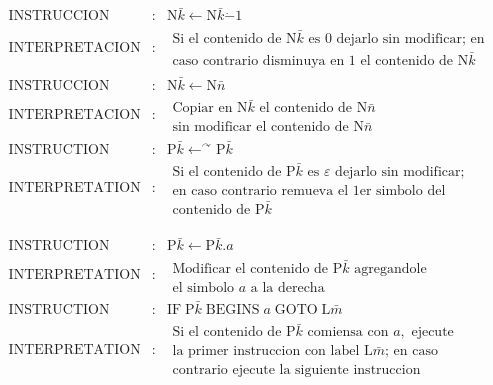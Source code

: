 \(\displaystyle \begin{array}{rcl} \text{INSTRUCCION} & :& \mathrm{N}\bar{k}\leftarrow \mathrm{N}\bar{k}\dot{-}1 \\ \text{INTERPRETACION} & :& \begin{array}{c} \text{Si el contenido de }\mathrm{N}\bar{k}\text{ es }0\text{ dejarlo sin modificar; en} \\ \text{caso contrario disminuya en 1 el contenido de }\mathrm{N}\bar{k}\; \end{array} \\ \text{INSTRUCCION} & :& \mathrm{N}\bar{k}\leftarrow \mathrm{N}\bar{n} \\ \text{INTERPRETACION} & :& \begin{array}{c} \text{Copiar en }\mathrm{N}\bar{k}\text{ el contenido de }\mathrm{N}\bar{n} \text{ } \\ \text{sin modificar el contenido de }\mathrm{N}\bar{n} \end{array} \\ \text{INSTRUCTION} & :& \mathrm{P}\bar{k}\leftarrow ^{\curvearrowright } \mathrm{P}\bar{k} \\ \text{INTERPRETATION} & :& \begin{array}{l} \text{Si el contenido de }\mathrm{P}\bar{k}\text{ es }\varepsilon \text{ dejarlo sin modificar;} \\ \text{en caso contrario remueva el 1er simbolo del} \\ \text{contenido de }\mathrm{P}\bar{k} \end{array} \end{array} \)

\(\displaystyle \begin{array}{rcl} \text{INSTRUCTION} & :& \mathrm{P}\bar{k}\leftarrow \mathrm{P}\bar{k}.a \\ \text{INTERPRETATION} & :& \begin{array}{l} \text{Modificar el contenido de }\mathrm{P}\bar{k}\text{ agregandole} \\ \text{el simbolo }a\text{ a la derecha} \end{array} \\ \text{INSTRUCTION} & :& \mathrm{IF}\;\mathrm{P}\bar{k}\;\mathrm{BEGINS}\;a\; \mathrm{GOTO}\;\mathrm{L}\bar{m} \\ \text{INTERPRETATION} & :& \begin{array}{l} \text{Si el contenido de }\mathrm{P}\bar{k}\text{ comiensa con }a,\text{ ejecute} \\ \text{la primer instruccion con label }\mathrm{L}\bar{m}\text{; en caso} \\ \text{contrario ejecute la siguiente instruccion} \end{array} \end{array} \)

